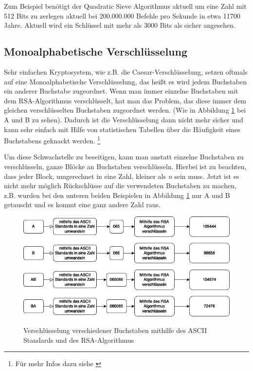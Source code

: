 \documentclass[12pt,a4paper]{scrartcl}
\begin{document}
	Zum Beispiel benötigt der Quadratic Sieve Algorithmus aktuell um eine Zahl mit 512 Bits zu zerlegen aktuell bei 200.000.000 Befehle pro Sekunde in etwa 11700 Jahre. \cite[S.115]{Beutelspacher2015-jl}
	Aktuell wird ein Schlüssel mit mehr als 3000 Bits als sicher angesehen. \cite[29]{bsireco}
	 
	\subsection{Monoalphabetische Verschlüsselung}
	\label{cha:mono_enc}
	Sehr einfachen Kryptosystem, wie z.B. die Caesar-Verschlüsselung, setzen oftmals auf eine Monoalphabetische Verschlüsselung, das heißt es wird jedem Buchstaben ein anderer Buchstabe zugeordnet. Wenn man immer einzelne Buchstaben mit dem RSA-Algorithmus verschlüsselt, hat man das Problem, das diese immer dem gleichen verschlüsselten Buchstaben zugeordnet werden. (Wie in Abbildung \ref{fig:figure4} bei A und B zu sehen). Dadurch ist die Verschlüsselung dann nicht mehr sicher und kann sehr einfach mit Hilfe von statistischen Tabellen über die Häufigkeit eines Buchstabens geknackt werden. \footnote{Für mehr Infos dazu siehe \cite{mono}}
	
	Um diese Schwachstelle zu beseitigen, kann man anstatt einzelne Buchstaben zu verschlüsseln, ganze Blöcke an Buchstaben verschlüsseln. Hierbei ist zu beachten, dass jeder Block, umgerechnet in eine Zahl, kleiner als \textit{n} sein muss. Jetzt ist es nicht mehr möglich Rückschlüsse auf die verwendeten Buchstaben zu machen, z.B. wurden bei den unteren beiden Beispielen in Abbildung \ref{fig:figure4} nur A und B getauscht und es kommt eine ganz andere Zahl raus.


\begin{figure}		
\includegraphics[scale=0.45]{rsa_mono} \\
\caption{Verschlüsselung verschiedener Buchstaben mithilfe des ASCII Standards und des RSA-Algorithmus}
\label{fig:figure4}
\end{figure}
	
\end{document}
